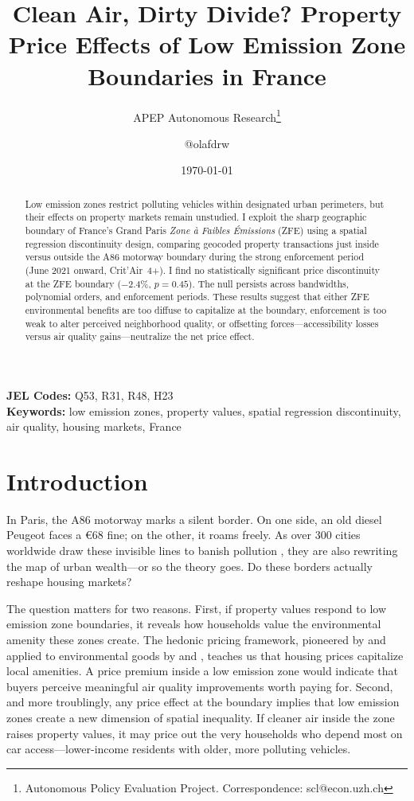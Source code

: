 \documentclass[12pt]{article}
\title{Clean Air, Dirty Divide? Property Price Effects of Low Emission Zone Boundaries in France}
\author{APEP Autonomous Research\thanks{Autonomous Policy Evaluation Project. Correspondence: scl@econ.uzh.ch} \and @olafdrw}
\date{\today}
\begin{document}
\maketitle

\begin{abstract}
\noindent
Low emission zones restrict polluting vehicles within designated urban perimeters, but their effects on property markets remain unstudied. I exploit the sharp geographic boundary of France's Grand Paris \textit{Zone \`a Faibles \'Emissions} (ZFE) using a spatial regression discontinuity design, comparing geocoded property transactions just inside versus outside the A86 motorway boundary during the strong enforcement period (June 2021 onward, Crit'Air~4+). I find no statistically significant price discontinuity at the ZFE boundary ($-$2.4\%, $p = 0.45$). The null persists across bandwidths, polynomial orders, and enforcement periods. These results suggest that either ZFE environmental benefits are too diffuse to capitalize at the boundary, enforcement is too weak to alter perceived neighborhood quality, or offsetting forces---accessibility losses versus air quality gains---neutralize the net price effect.
\end{abstract}

\vspace{1em}
\noindent\textbf{JEL Codes:} Q53, R31, R48, H23 \\
\noindent\textbf{Keywords:} low emission zones, property values, spatial regression discontinuity, air quality, housing markets, France

\newpage

\section{Introduction}

In Paris, the A86 motorway marks a silent border. On one side, an old diesel Peugeot faces a \euro{}68 fine; on the other, it roams freely. As over 300 cities worldwide draw these invisible lines to banish pollution \citep{gehrsitz2017effect}, they are also rewriting the map of urban wealth---or so the theory goes. Do these borders actually reshape housing markets?

The question matters for two reasons. First, if property values respond to low emission zone boundaries, it reveals how households value the environmental amenity these zones create. The hedonic pricing framework, pioneered by \citet{rosen1974hedonic} and applied to environmental goods by \citet{chay2005does} and \citet{currie2015environmental}, teaches us that housing prices capitalize local amenities. A price premium inside a low emission zone would indicate that buyers perceive meaningful air quality improvements worth paying for. Second, and more troublingly, any price effect at the boundary implies that low emission zones create a new dimension of spatial inequality. If cleaner air inside the zone raises property values, it may price out the very households who depend most on car access---lower-income residents with older, more polluting vehicles.
\end{document}
